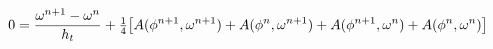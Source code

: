 \documentclass[preview]{standalone}
\begin{document}
\begin{align*}
\special{dvisvgm:raw <g id='unique000'>}0=\frac{\omega^{n+1}-\omega^n}{h_t}+\tfrac14\big[A(\phi^{n+1},\omega^{n+1})+A(\phi^n,\omega^{n+1})+A(\phi^{n+1},\omega^n)+A(\phi^n,\omega^n)\big]\special{dvisvgm:raw </g>}
\end{align*}
\end{document}
